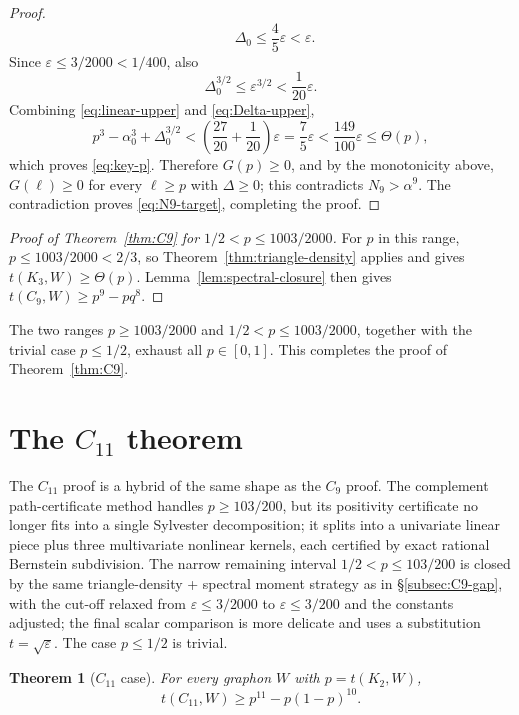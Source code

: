 \documentclass[11pt]{article}
\newtheorem{theorem}{Theorem}[section]
\newcommand{\eps}{\varepsilon}
\begin{document}
\begin{proof}
\begin{equation}
        \qquad
        \Delta_0\le \frac45\eps<\eps.
\end{equation}
Since $\eps\le3/2000<1/400$, also
\begin{equation}\label{eq:Delta-upper}
        \Delta_0^{3/2}\le \eps^{3/2}<\frac1{20}\eps.
\end{equation}
Combining \eqref{eq:linear-upper} and \eqref{eq:Delta-upper},
\[
        p^3-\alpha_0^3+\Delta_0^{3/2}
        <\left(\frac{27}{20}+\frac1{20}\right)\eps
        =\frac75\eps
        <\frac{149}{100}\eps
        \le\Theta(p),
\]
which proves \eqref{eq:key-p}.  Therefore $G(p)\ge0$, and by the monotonicity above, $G(\ell)\ge0$ for every $\ell\ge p$ with $\Delta\ge0$; this contradicts $N_9>\alpha^9$.  The contradiction proves \eqref{eq:N9-target}, completing the proof.
\end{proof}

\begin{proof}[Proof of Theorem~\ref{thm:C9} for $1/2<p\le1003/2000$]
For $p$ in this range, $p\le1003/2000<2/3$, so Theorem~\ref{thm:triangle-density} applies and gives $t(K_3,W)\ge\Theta(p)$.  Lemma~\ref{lem:spectral-closure} then gives $t(C_9,W)\ge p^9-pq^8$.
\end{proof}

The two ranges $p\ge1003/2000$ and $1/2<p\le1003/2000$, together with the trivial case $p\le1/2$, exhaust all $p\in[0,1]$.  This completes the proof of Theorem~\ref{thm:C9}.

\section{The $C_{11}$ theorem}\label{sec:C11}

The $C_{11}$ proof is a hybrid of the same shape as the $C_9$ proof.  The complement path-certificate method handles $p\ge103/200$, but its positivity certificate no longer fits into a single Sylvester decomposition; it splits into a univariate linear piece plus three multivariate nonlinear kernels, each certified by exact rational Bernstein subdivision.  The narrow remaining interval $1/2<p\le103/200$ is closed by the same triangle-density + spectral moment strategy as in \S\ref{subsec:C9-gap}, with the cut-off relaxed from $\eps\le3/2000$ to $\eps\le3/200$ and the constants adjusted; the final scalar comparison is more delicate and uses a substitution $t=\sqrt\eps$.  The case $p\le1/2$ is trivial.

\begin{theorem}[$C_{11}$ case]\label{thm:C11}
For every graphon $W$ with $p=t(K_2,W)$,
\[
        t(C_{11},W)\ge p^{11}-p(1-p)^{10}.
\]
\end{theorem}
\end{document}
